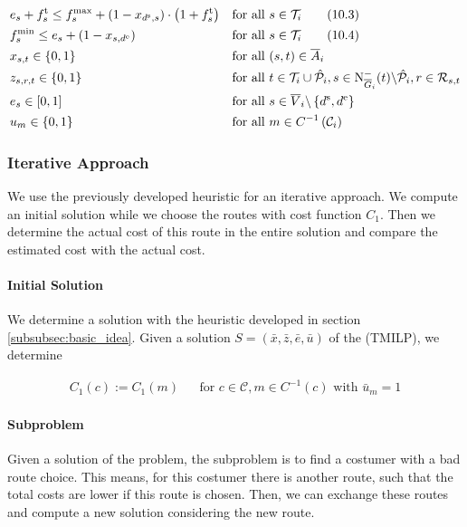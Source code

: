 \begin{align}
	& e_s + f^{\operatorname{t}}_s \leq f^{\max}_s + \left(1-x_{d^{\operatorname{s}},s}\right)\cdot\left(1+f^{\operatorname{t}}_s\right) && \text{for all } s\in\mathcal{T}_i \tag{10.3} \\
	& f^{\min}_s \leq e_s + \left(1-x_{s,d^{\operatorname{e}}}\right) && \text{for all } s\in\mathcal{T}_i \tag{10.4} \\
	& x_{s,t}\in\{0,1\} & & \text{for all } (s,t)\in\overline{A}_i \\
	& z_{s,r,t}\in\{0,1\} & & \text{for all } t\in\mathcal{T}_i\cup\hat{\mathcal{P}}_i,s\in\operatorname{N}_{\overline{G}_i}^-(t)\backslash\hat{\mathcal{P}}_i,r\in\mathcal{R}_{s,t} \\
	& e_s\in[0,1] & & \text{for all } s\in\overline{V}_i\backslash\left\{d^{\operatorname{s}},d^{\operatorname{e}}\right\} \\
	& u_m\in\{0,1\} && \text{for all } m\in C^{-1}\left(\mathcal{C}_i\right)
\end{align}

\pagestyle{headings}
\newpage


\subsubsection{Iterative Approach}

We use the previously developed heuristic for an iterative approach. We compute an initial solution while we choose the routes with cost function $C_1$. Then we determine the actual cost of this route in the entire solution and compare the estimated cost with the actual cost.

\paragraph{Initial Solution} \parfill

We determine a solution with the heuristic developed in section \ref{subsubsec:basic_idea}. Given a solution $S=\left(\bar{x},\bar{z},\bar{e},\bar{u}\right)$ of the (TMILP), we determine 

\begin{align*}
	C_1(c) := C_1(m) && \text{for } c\in\mathcal{C}, m\in C^{-1}(c) \text{ with } \bar{u}_m = 1
\end{align*}

\paragraph{Subproblem} \parfill

Given a solution of the problem, the subproblem is to find a costumer with a bad route choice. This means, for this costumer there is another route, such that the total costs are lower if this route is chosen. Then, we can exchange these routes and compute a new solution considering the new route. 

